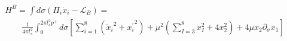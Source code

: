 \begin{equation}
\begin{array}{l}
\displaystyle{
H^B = \int d \sigma \left( \Pi_i \dot{x}_i - \mathcal{L}_B \right) =  }\\
\displaystyle{
\qquad \frac{1}{4 \pi l_s^2} \int_{0}^{2 \pi l_s^2 p^+} d \sigma 
   \left[ \sum_{i=1}^8 ({\dot{x}_i}^2 + {{x}_i^{\prime}}^2 ) + 
       \mu^2 \left( \sum_{I=3}^8 x_I^2 + 4 x_2^2 \right) + 4 \mu x_2 \partial_\sigma x_1  \right]}
\end{array}
\end{equation}

